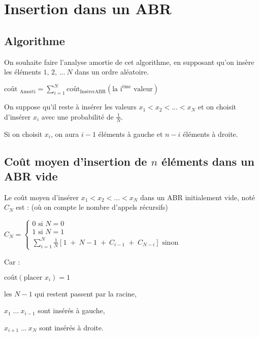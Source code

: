 \section{Insertion dans un ABR}

\subsection{Algorithme}



On souhaite faire l'analyse amortie de cet algorithme, en supposant qu'on insère les éléments $1,\, 2,\, ...\ N$ dans un ordre aléatoire.

$\text{coût }_{\text{Amorti}} = \sum\limits_{i = 1}^{N} \text{coût}_{\text{InsérerABR}} (\text{la i}^{\text{ème}}\text{ valeur})$

On suppose qu'il reste à insérer les valeurs $x_{1} < x_{2} < ... < x_{N}$ et on choisit d'insérer $x_{i}$ avec une probabilité de $\frac{1}{N}$.

Si on choisit $x_{i}$, on aura $i-1$ éléments à gauche et $n-i$ éléments à droite.\\

\subsection{Coût moyen d'insertion de $n$ éléments dans un ABR vide}

\begin{proposition}
Le coût moyen d'insérer $x_{1} < x_{2} < ... < x_{N}$ dans un ABR initialement vide, noté $C_{N}$ est : (où on compte le nombre d'appels récursifs)

\vspace{0.16cm} %
$ C_{N} = 
   \left \{
   \begin{array}{l}
      0 \text{ si } N = 0 \\
      1 \text{ si } N = 1 \\
      \sum\limits_{i = 1}^{N} \frac{1}{N}[ 1 \;+\ N-1 \;+\ C_{i-1} \;+\; C_{N-i} ] \text{ sinon }
   \end{array}
   \right .
$
\vspace{0.16cm}

Car : \begin{minipage}[t]{\textwidth}
	$\text{coût}(\text{placer } x_{i}) = 1$
	
	les $N - 1$ qui restent passent par la racine,
	
	$x_{1}\; ...\ x_{i-1}$ sont insérés à gauche,
	
	$x_{i+1}\; ...\ x_{N}$ sont insérés à droite.
\end{minipage}

\end{proposition}

